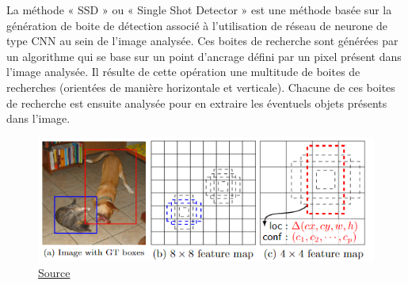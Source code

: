 \documentclass[a4paper,12pt]{article} %
\begin{document}
La méthode « SSD » ou « Single Shot Detector » est une méthode basée sur la génération de boite de détection associé à l’utilisation de réseau de neurone de type CNN au sein de l’image analysée. 
Ces boites de recherche sont générées par un algorithme qui se base sur un point d’ancrage défini par un pixel présent dans l’image analysée.  Il résulte de cette opération une multitude de boites de recherches (orientées de manière horizontale et verticale). Chacune de ces boites de recherche est ensuite analysée pour en extraire les éventuels objets présents dans l’image.\newline 
\begin{figure}[h] %
  \centering %
  \includegraphics[scale=0.80]{ssd.png} %
   \caption{\href{https://towardsdatascience.com/review-ssd-single-shot-detector-object-detection-851a94607d11}{Source} }
\end{figure}

\newpage
\end{document}

